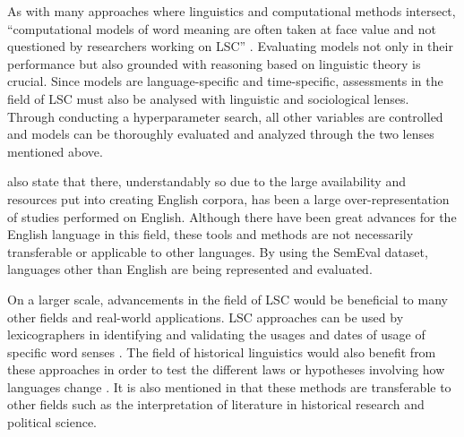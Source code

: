 As with many approaches where linguistics and computational methods intersect, “computational models of word meaning are often taken at face value and not questioned by researchers working on LSC” \citep{hengchen2021challenges}. Evaluating models not only in their performance but also grounded with reasoning based on linguistic theory is crucial. Since models are language-specific and time-specific, assessments in the field of LSC must also be analysed with linguistic and sociological lenses. Through conducting a hyperparameter search, all other variables are controlled and models can be thoroughly evaluated and analyzed through the two lenses mentioned above. 

\citet{hengchen2021challenges} also state that there, understandably so due to the large availability and resources put into creating English corpora, has been a large over-representation of studies performed on English. Although there have been great advances for the English language in this field, these tools and methods are not necessarily transferable or applicable to other languages. By using the SemEval dataset, languages other than English are being represented and evaluated. 

On a larger scale, advancements in the field of LSC would be beneficial to many other fields and real-world applications. LSC approaches can be used by lexicographers in identifying and validating the usages and dates of usage of specific word senses \citep{lau-etal-2012-word, falk-etal-2014-non, klosa-2018-newgerman}. The field of historical linguistics would also benefit from these approaches in order to test the different laws or hypotheses involving how languages change \citep{hamilton-etal-2016-diachronic, Xu2015ACE}. It is also mentioned in \citet{hengchen2021challenges} that these methods are transferable to other fields such as the interpretation of literature in historical research and political science.  


